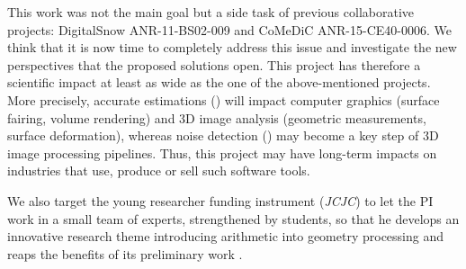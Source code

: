 This work was not the main goal but a side task of previous collaborative projects: 
DigitalSnow ANR-11-BS02-009 and CoMeDiC ANR-15-CE40-0006. 
We think that it is now time to completely address this issue 
and investigate the new perspectives that the proposed solutions open. 
This project has therefore a scientific impact at least as wide as the one of the above-mentioned projects. 
More precisely, accurate estimations (\wpEstim)
will impact computer graphics (surface fairing, volume rendering)
and 3D image analysis (geometric measurements, surface deformation), 
whereas noise detection (\wpScale) may become a key step of 3D image processing pipelines.  
Thus, this project may have long-term impacts on industries that use, produce or sell such software tools. 




We also target the young researcher funding instrument (\emph{JCJC}) 
to let the PI work in a small team of experts, strengthened by students, so that
he develops an innovative research theme introducing arithmetic into geometry processing and
reaps the benefits of its preliminary work \cite{LPRJMIV2017}. 



